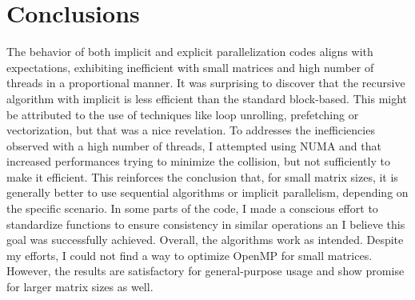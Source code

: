 \section{Conclusions}
The behavior of both implicit and explicit parallelization codes aligns with expectations, exhibiting inefficient with small matrices and high number of threads in a proportional manner. It was surprising to discover that the recursive algorithm with implicit is less efficient than the standard block-based. This might be attributed to the use of techniques like loop unrolling, prefetching or vectorization, but that was a nice revelation. To addresses the inefficiencies observed with a high number of threads, I attempted using NUMA and that increased performances trying to minimize the collision, but not sufficiently to make it efficient. This reinforces the conclusion that, for small matrix sizes, it is generally better to use sequential algorithms or implicit parallelism, depending on the specific scenario. In some parts of the code, I made a conscious effort to standardize functions to ensure consistency in similar operations an I believe this goal was successfully achieved. Overall, the algorithms work as intended. Despite my efforts, I could not find a way to optimize OpenMP for small matrices. However, the results are satisfactory for general-purpose usage and show promise for larger matrix sizes as well. \newline\newline\newline
